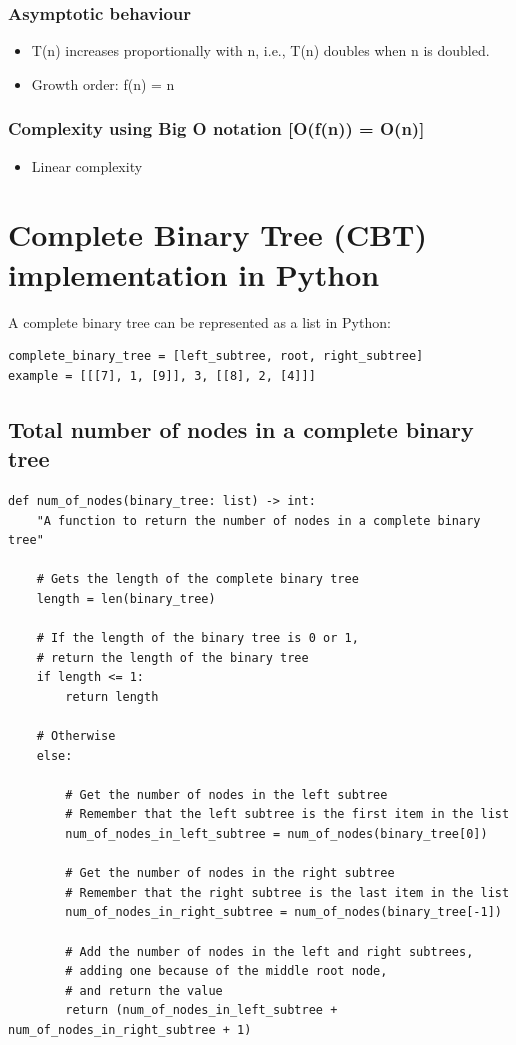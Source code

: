 \documentclass[11pt]{article}
\begin{document}
\subsubsection{Asymptotic behaviour}
\label{sec:org491b72c}
\begin{itemize}
\item T(n) increases proportionally with n, i.e., T(n) doubles when n is doubled.
\item Growth order: f(n) = n
\end{itemize}

\subsubsection{Complexity using Big O notation [O(f(n)) = O(n)]}
\label{sec:orgc7c6f1e}
\begin{itemize}
\item Linear complexity
\end{itemize}

\section{Complete Binary Tree (CBT) implementation in Python}
\label{sec:orgbf8d478}
A complete binary tree can be represented as a list in Python:
\begin{verbatim}
complete_binary_tree = [left_subtree, root, right_subtree]
example = [[[7], 1, [9]], 3, [[8], 2, [4]]]
\end{verbatim}

\subsection{Total number of nodes in a complete binary tree}
\label{sec:org1183d79}
\begin{verbatim}
def num_of_nodes(binary_tree: list) -> int:
    "A function to return the number of nodes in a complete binary tree"

    # Gets the length of the complete binary tree
    length = len(binary_tree)

    # If the length of the binary tree is 0 or 1,
    # return the length of the binary tree
    if length <= 1:
        return length

    # Otherwise
    else:

        # Get the number of nodes in the left subtree
        # Remember that the left subtree is the first item in the list
        num_of_nodes_in_left_subtree = num_of_nodes(binary_tree[0])

        # Get the number of nodes in the right subtree
        # Remember that the right subtree is the last item in the list
        num_of_nodes_in_right_subtree = num_of_nodes(binary_tree[-1])

        # Add the number of nodes in the left and right subtrees,
        # adding one because of the middle root node,
        # and return the value
        return (num_of_nodes_in_left_subtree + num_of_nodes_in_right_subtree + 1)
\end{verbatim}
\end{document}
